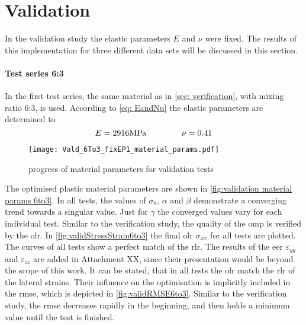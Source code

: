 \newpage
\section{Validation}\label{sec: validation}
 In the validation study the elastic parameters $E$ and $\nu$ were fixed. The results of this implementation for three different data sets will be discussed in this section.
\paragraph{Test series 6:3}
In the first test series, the same material as in \autoref{sec: verification}, with mixing ratio 6:3, is used. According to \autoref{eq: EandNu} the elastic parameters are determined to 
\begin{equation*}
    E = 2916\unit{MPa} \hspace{1.5cm} \nu = 0.41 
\end{equation*}

\begin{figure}[H]
    \centering
    \texttt{[image: Vald\_6To3\_fixEP1\_material\_params.pdf]}
    \caption{progress of material parameters for validation tests}
    \label{fig:validation material params 6to3}
\end{figure}

The optimised plastic material parameters are shown in \autoref{fig:validation material params 6to3}.  In all tests, the values of $\sigma_0$, $\alpha$ and $\beta$ demonstrate a converging trend towards a singular value. Just for $\gamma$ the converged values vary for each individual test. Similar to the verification study, the quality of the \acrlong{omp} is verified by the \acrlong{olr}. In \autoref{fig:validStressStrain6to3} the final \acrlong{olr} $\sigma_{xx}$ for all tests are plotted. The curves of all tests show a perfect match of the \acrlong{rlr}. The results of the \acrlong{eer} $\varepsilon_{yy}$ and $\varepsilon_{zz}$ are added in Attachment XX, since their presentation would be beyond the scope of this work. It can be stated, that in all tests the \acrlong{olr} match the \acrlong{rlr} of the lateral strains. Their influence on the optimisation is implicitly included in the \acrshort{rmse}, which is depicted in \autoref{fig:validRMSE6to3}. Similar to the verification study, the \acrshort{rmse} decreases rapidly in the beginning, and then holds a minimum value until the test is finished.




